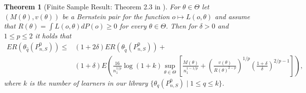 \documentclass[11pt, a4paper]{article}
\newtheorem{theorem}{Theorem}
\theoremstyle{definition}
\theoremstyle{remark}
\newcommand{\q}{q}
\newcommand{\btheta}{\theta}
\begin{document}
\begin{theorem}[Finite Sample Result: Theorem 2.3 in \cite{vaart06}] \label{finitesample}
   For $ \btheta \in \Theta $ let $ (M(\btheta) , v(\btheta)) $ be a Bernstein pair for the function $ o \mapsto L(o, \btheta) $ and assume that $ R(\btheta) = \int L(o, \btheta) d P(o) \geq 0 $ for every $ \btheta \in \Theta $. Then for $ \delta > 0 $ and $ 1 \leq p \leq 2 $ it holds that 
   \begin{align*}
       ER(\btheta_{\hat{\q}}(P_{n, S}^{0})) \leq&(1 + 2 \delta) ER(\btheta_{ \tilde{\q}}(P_{n,S}^{0})) +\\
                                              &(1 + \delta) E \left(  \frac{16}{n_1^{1/p}} \log (1 +k) \sup_{\btheta \in \Theta} \left[ \frac{M(\btheta)}{n_1^{1-1/p}} +  \left( \frac{v(\btheta)}{R(\btheta)^{2-p}} \right)^{1/p} \left( \frac{1 + \delta}{\delta} \right)^{2/p-1} \right]\right),
   \end{align*}
   where $ k $ is the number of learners in our library $ \{\btheta_{\q}(P_{n, S}^{0}) \mid 1 \leq \q \leq k\} $. 
\end{theorem}
\end{document}
